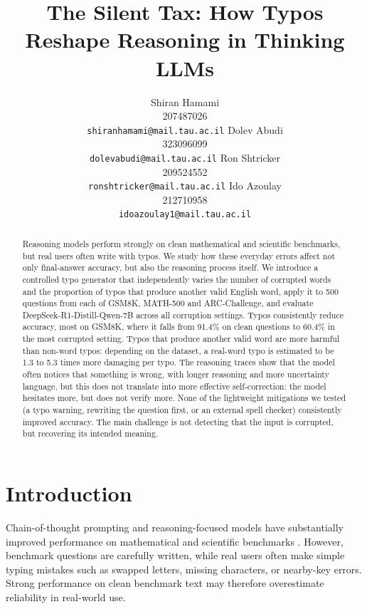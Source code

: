 \documentclass[11pt]{article}
\title{The Silent Tax: How Typos Reshape Reasoning in Thinking LLMs}
\author{%
  Shiran Hamami \\ 207487026 \\ \small\texttt{shiranhamami@mail.tau.ac.il}
  \And
  Dolev Abudi \\ 323096099 \\ \small\texttt{dolevabudi@mail.tau.ac.il}
  \AND
  Ron Shtricker \\ 209524552 \\ \small\texttt{ronshtricker@mail.tau.ac.il}
  \And
  Ido Azoulay \\ 212710958 \\ \small\texttt{idoazoulay1@mail.tau.ac.il}
}
\begin{document}
\maketitle

\begin{abstract}
Reasoning models perform strongly on clean mathematical and scientific
benchmarks, but real users often write with typos. We study how these everyday
errors affect not only final-answer accuracy, but also the reasoning process
itself. We introduce a controlled typo generator that independently varies the
number of corrupted words and the proportion of typos that produce another
valid English word, apply it to 500 questions from each of GSM8K, MATH-500 and
ARC-Challenge, and evaluate DeepSeek-R1-Distill-Qwen-7B across all corruption
settings. Typos consistently reduce accuracy, most on GSM8K, where it falls from
91.4\% on clean questions to 60.4\% in the most corrupted setting. Typos that
produce another valid word are more harmful than non-word typos: depending on
the dataset, a real-word typo is estimated to be 1.3 to 5.3 times more damaging
per typo. The reasoning traces show that the model often notices that something
is wrong, with longer reasoning and more uncertainty language, but this does not
translate into more effective self-correction: the model hesitates more, but
does not verify more. None of the lightweight mitigations we tested (a typo
warning, rewriting the question first, or an external spell checker)
consistently improved accuracy. The main challenge is not detecting that the
input is corrupted, but recovering its intended meaning.
\end{abstract}

\section{Introduction}

Chain-of-thought prompting and reasoning-focused models have substantially
improved performance on mathematical and scientific benchmarks
\citep{wei2022,deepseekr1}. However, benchmark questions are carefully written,
while real users often make simple typing mistakes such as swapped letters,
missing characters, or nearby-key errors. Strong performance on clean benchmark
text may therefore overestimate reliability in real-world use.
\end{document}

